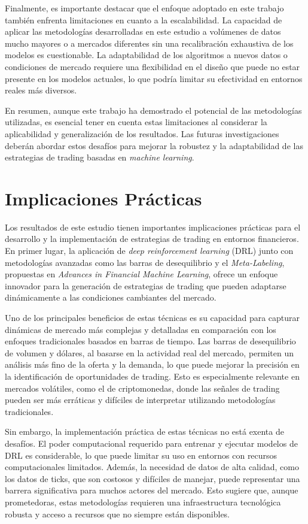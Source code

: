 \documentclass[a4paper,12pt, twoside]{report}
\begin{document}
Finalmente, es importante destacar que el enfoque adoptado en este trabajo también enfrenta 
limitaciones en cuanto a la escalabilidad. La capacidad de aplicar las metodologías 
desarrolladas en este estudio a volúmenes de datos mucho mayores o a mercados diferentes 
sin una recalibración exhaustiva de los modelos es cuestionable. La adaptabilidad de los 
algoritmos a nuevos datos o condiciones de mercado requiere una flexibilidad en el diseño 
que puede no estar presente en los modelos actuales, lo que podría limitar su efectividad 
en entornos reales más diversos.

En resumen, aunque este trabajo ha demostrado el potencial de las metodologías utilizadas, 
es esencial tener en cuenta estas limitaciones al considerar la aplicabilidad y 
generalización de los resultados. Las futuras investigaciones deberán abordar estos 
desafíos para mejorar la robustez y la adaptabilidad de las estrategias de trading basadas 
en \textit{machine learning}.



\section{Implicaciones Prácticas}

Los resultados de este estudio tienen importantes implicaciones prácticas para el desarrollo 
y la implementación de estrategias de trading en entornos financieros. En primer lugar, la 
aplicación de \textit{deep reinforcement learning} (DRL) junto con metodologías avanzadas 
como las barras de desequilibrio y el \textit{Meta-Labeling}, propuestas en \textit{Advances 
in Financial Machine Learning}, ofrece un enfoque innovador para la generación de estrategias de trading que pueden adaptarse dinámicamente a las condiciones cambiantes del mercado.

Uno de los principales beneficios de estas técnicas es su capacidad para capturar dinámicas 
de mercado más complejas y detalladas en comparación con los enfoques tradicionales basados 
en barras de tiempo. Las barras de desequilibrio de volumen y dólares, al basarse en la actividad 
real del mercado, permiten un análisis más fino de la oferta y la demanda, lo que puede mejorar 
la precisión en la identificación de oportunidades de trading. Esto es especialmente relevante 
en mercados volátiles, como el de criptomonedas, donde las señales de trading pueden ser más 
erráticas y difíciles de interpretar utilizando metodologías tradicionales.

Sin embargo, la implementación práctica de estas técnicas no está exenta de desafíos. El 
poder computacional requerido para entrenar y ejecutar modelos de DRL es considerable, 
lo que puede limitar su uso en entornos con recursos computacionales limitados. Además, 
la necesidad de datos de alta calidad, como los datos de ticks, que son costosos y 
difíciles de manejar, puede representar una barrera significativa para muchos actores 
del mercado. Esto sugiere que, aunque prometedoras, estas metodologías requieren una 
infraestructura tecnológica robusta y acceso a recursos que no siempre están disponibles.
\end{document}
